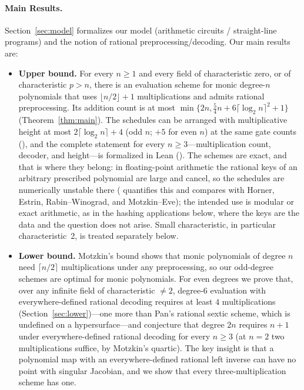 \paragraph{Main Results.}
Section~\ref{sec:model} formalizes our model (arithmetic circuits / straight-line programs) and the notion of rational preprocessing/decoding.
Our main results are:
\begin{itemize}
   \item \textbf{Upper bound.} For every $n\ge 1$ and every field of characteristic zero, or of characteristic $p>n$, there is an evaluation scheme for monic degree-$n$ polynomials that uses $\lfloor n/2\rfloor+1$ multiplications and admits rational preprocessing.  Its addition count is at most
   $\min\{2n,\frac54n+6\lceil\log_2n\rceil^2+1\}$
   (Theorem~\ref{thm:main}).  The schedules can be arranged with
   multiplicative height at most $2\lceil\log_2n\rceil+4$ (odd $n$; $+5$
   for even $n$) at the same gate
   counts (), and the complete
   statement for every $n\ge3$---multiplication count, decoder, and
   height---is formalized in Lean ().  The
   schemes are exact, and that is where they belong: in
   floating-point arithmetic the rational keys of an arbitrary prescribed
   polynomial are large and cancel, so the schedules are numerically unstable
   there ( quantifies this and compares with
   Horner, Estrin, Rabin--Winograd, and Motzkin--Eve); the intended use is
   modular or exact arithmetic, as in the hashing applications below, where
   the keys are the data and the question does not arise.
   Small characteristic, in particular characteristic~2, is treated
   separately below.
   \item \textbf{Lower bound.} Motzkin's bound shows that monic polynomials of degree $n$ need $\lceil n/2\rceil$ multiplications under any preprocessing, so our odd-degree schemes are optimal for monic polynomials.  For even degrees we prove that, over any infinite field of characteristic $\neq2$, degree-$6$ evaluation with everywhere-defined rational decoding requires at least $4$ multiplications (Section~\ref{sec:lower})---one more than Pan's rational sextic scheme, which is undefined on a hypersurface---and conjecture that degree $2n$ requires $n+1$ under everywhere-defined rational decoding for every $n\ge3$ (at $n=2$ two multiplications suffice, by Motzkin's quartic).
      The key insight is that a polynomial map with an everywhere-defined rational left inverse can have no point with singular Jacobian, and we show that every three-multiplication scheme has one.

\end{itemize}
